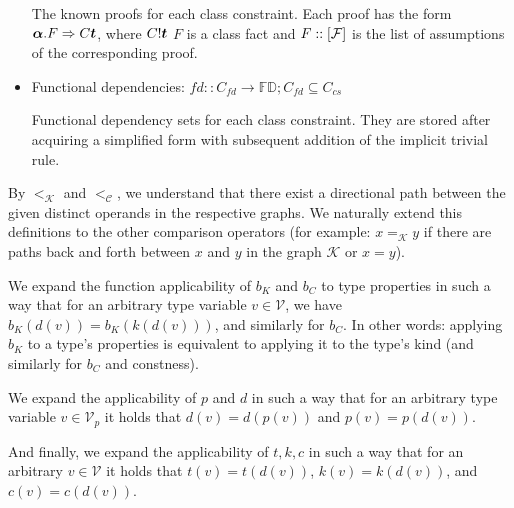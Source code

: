 \begin{defn}
\begin{itemize}
        The known proofs for each class constraint. Each proof has the form $\boldsymbol{\alpha} . F \Rightarrow C \boldsymbol{t}$, where $C! \boldsymbol{t}$ $F$ is a class fact and $F :: [\mathcal F]$ is the list of assumptions of the corresponding proof.
        \item Functional dependencies: $fd :: C_{fd} \to \mathbb{FD}; C_{fd} \subseteq C_{cs}$
        
        Functional dependency sets for each class constraint. They are stored after acquiring a simplified form with subsequent addition of the implicit trivial rule. 
    \end{itemize}

    By $<_{\mathcal{K}}$ and $<_{\mathcal{C}}$,
    we understand that there exist a directional path between the given distinct operands in the respective graphs.
    We naturally extend this definitions to the other comparison operators
    (for example: $x =_{\mathcal{K}} y$ if there are paths back and forth between $x$ and $y$ in the graph $\mathcal{K}$ or $x = y$). %

\end{defn}

\begin{defn}
    We expand the function applicability of $b_K$ and $b_C$ to type properties in such a way that for an arbitrary type variable $v \in \mathcal{V}$, we have $b_K (d (v)) = b_K (k (d (v)))$, and similarly for $b_C$. In other words: applying $b_K$ to a type's properties is equivalent to applying it to the type's kind (and similarly for $b_C$ and constness).

    We expand the applicability of $p$ and $d$ in such a way that for an arbitrary type variable $v \in \mathcal{V}_p$ it holds that $d(v) = d(p(v))$ and $p(v) = p(d(v))$.

    And finally, we expand the applicability of $t, k, c$ in such a way that for an arbitrary $v \in \mathcal{V}$ it holds that $t (v) = t (d (v))$, $k (v) = k (d (v))$, and $c (v) = c (d (v))$.
\end{defn}

